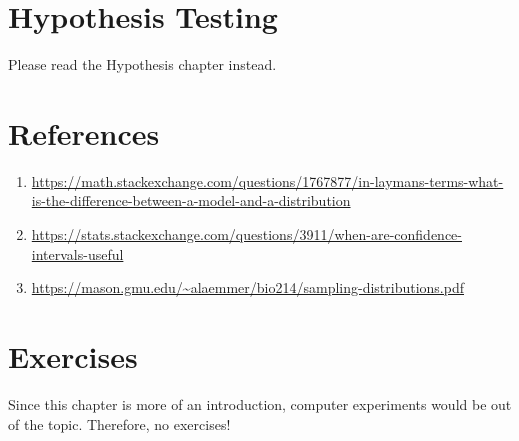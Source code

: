 \section{Hypothesis Testing}
Please read the Hypothesis chapter instead. \\

\section{References}

\begin{enumerate}
    \item  \url{https://math.stackexchange.com/questions/1767877/in-laymans-terms-what-is-the-difference-between-a-model-and-a-distribution}
    \item \url{https://stats.stackexchange.com/questions/3911/when-are-confidence-intervals-useful}
    \item \url{https://mason.gmu.edu/~alaemmer/bio214/sampling-distributions.pdf}
    \end{enumerate} 
\section{Exercises}
Since this chapter is more of an introduction, computer experiments would be out of the topic. Therefore, no exercises!
